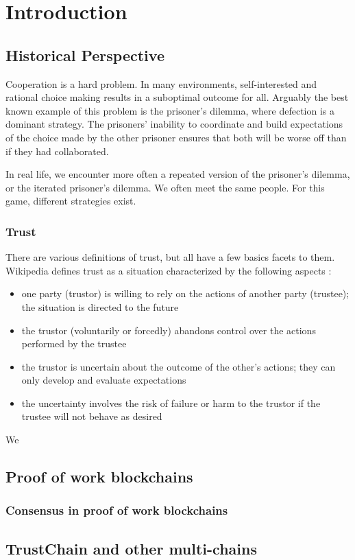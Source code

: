 \chapter{Introduction}
\section{Historical Perspective}
Cooperation is a hard problem. In many environments, self-interested and rational choice making results in a suboptimal outcome for all. Arguably the best known example of this problem is the prisoner's dilemma, where defection is a dominant strategy. The prisoners' inability to coordinate and build expectations of the choice made by the other prisoner ensures that both will be worse off than if they had collaborated.

In real life, we encounter more often a repeated version of the prisoner's dilemma, or the iterated prisoner's dilemma. We often meet the same people. For this game, different strategies exist. 

\subsection{Trust}
There are various definitions of trust, but all have a few basics facets to them. Wikipedia defines trust as a situation characterized by the following aspects \cite{wikipedia_trust}:
\begin{itemize}
	\item one party (trustor) is willing to rely on the actions of another party (trustee); the situation is directed to the future
	\item the trustor (voluntarily or forcedly) abandons control over the actions performed by the trustee
	\item the trustor is uncertain about the outcome of the other's actions; they can only develop and evaluate expectations
	\item the uncertainty involves the risk of failure or harm to the trustor if the trustee will not behave as desired
\end{itemize}
We 



\section{Proof of work blockchains}

\subsection{Consensus in proof of work blockchains}

\section{TrustChain and other multi-chains}
